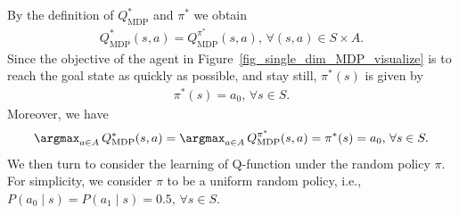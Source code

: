 \begin{myproof}
By the definition of $Q_\text{MDP}^*$ and $\pi^*$ we obtain
    \begin{align}
        Q_\text{MDP}^*(s, a) = Q_\text{MDP}^{\pi^*}(s, a), \, \forall (s, a) \in S \times A.
    \end{align}
    Since the objective of the agent in Figure~\ref{fig_single_dim_MDP_visualize} is to reach the goal state as quickly as possible, and stay still, $\pi^*(s)$ is given by
    \begin{align}
        \pi^*(s) = a_0, \, \forall s \in S.
    \end{align}
    Moreover, we have
    \begin{align}
        \argmax_{ a \in A} \, Q_\text{MDP}^*(s, a) = \argmax_{ a \in A} \, Q_\text{MDP}^{\pi^*}(s, a) = \pi^*(s) = a_0, \, \forall s \in S.
    \end{align}
We then turn to consider the learning of Q-function under the random policy $\pi$. For simplicity, we consider $\pi$ to be a uniform random policy, i.e., $P(a_0 \mid s) = P(a_1 \mid s) = 0.5, \, \forall s \in S.$


\end{myproof}

